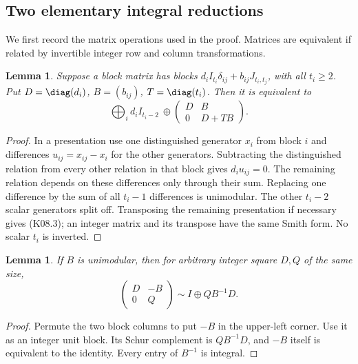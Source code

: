 \documentclass[11pt,a4paper]{article}
\newtheorem{lemma}[theorem]{Lemma}
\theoremstyle{definition}\newtheorem{definition}[theorem]{Definition}
\theoremstyle{remark}\newtheorem{remark}[theorem]{Remark}
\numberwithin{equation}{section}
\begin{document}
\subsection{Two elementary integral reductions}\label{K08-sec-2}
We first record the matrix operations used in the proof. Matrices are equivalent if related by invertible integer row and column transformations.
\begin{lemma}\label{K08-compress}
Suppose a block matrix has blocks $d_iI_{t_i}\delta_{ij}+b_{ij}J_{t_i,t_j}$, with all $t_i\geq2$. Put $D=\diag(d_i)$, $B=(b_{ij})$, $T=\diag(t_i)$. Then it is equivalent to
\[
 \bigoplus_i d_iI_{t_i-2}\ \oplus
 \begin{pmatrix}D&B\\0&D+TB\end{pmatrix}.                   \tag{K08.3}
\]
\end{lemma}
\begin{proof}
In a presentation use one distinguished generator $x_i$ from block $i$ and differences $u_{ij}=x_{ij}-x_i$ for the other generators. Subtracting the distinguished relation from every other relation in that block gives $d_i u_{ij}=0$. The remaining relation depends on these differences only through their sum. Replacing one difference by the sum of all $t_i-1$ differences is unimodular. The other $t_i-2$ scalar generators split off. Transposing the remaining presentation if necessary gives (K08.3); an integer matrix and its transpose have the same Smith form. No scalar $t_i$ is inverted.
\end{proof}
\begin{lemma}\label{K08-pivot}
If $B$ is unimodular, then for arbitrary integer square $D,Q$ of the same size,
\[
 \begin{pmatrix}D&-B\\0&Q\end{pmatrix}
 \sim I\oplus QB^{-1}D.                                    \tag{K08.4}
\]
\end{lemma}
\begin{proof}
Permute the two block columns to put $-B$ in the upper-left corner. Use it as an integer unit block. Its Schur complement is $QB^{-1}D$, and $-B$ itself is equivalent to the identity. Every entry of $B^{-1}$ is integral.
\end{proof}
\end{document}
